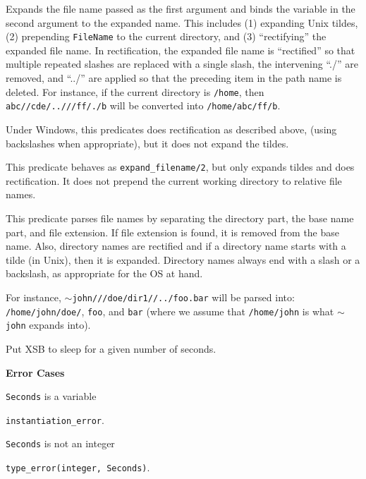 \begin{description}
%
Expands the file name passed as the first argument and binds the
variable in the second argument to the expanded name. This includes
(1) expanding Unix tildes, (2) prepending {\tt FileName} to the
current directory, and (3) ``rectifying'' the expanded file name.  In
rectification, the expanded file name is ``rectified'' so that
multiple repeated slashes are replaced with a single slash, the
intervening ``./'' are removed, and ``../'' are applied so that the
preceding item in the path name is deleted. For instance, if the
current directory is {\tt /home}, then {\tt abc//cde/..///ff/./b} will
be converted into {\tt /home/abc/ff/b}.

Under Windows, this predicates does rectification as described above,
(using backslashes when appropriate), but it does not expand the
tildes.

This predicate behaves as {\tt expand\_filename/2}, but only expands
tildes and does rectification. It does not prepend the current working
directory to relative file names.

This predicate parses file names by separating the directory part, the base
name part, and file extension. If file extension is found, it is removed
from the base name. Also, directory names are rectified and if a directory
name starts with a tilde (in Unix), then it is expanded. Directory names
always end with a slash or a backslash, as appropriate for the OS at hand.

For instance, {\tt $\sim$john///doe/dir1//../foo.bar} will be parsed into:
{\tt /home/john/doe/}, {\tt foo}, and {\tt bar} (where we assume that    
{\tt /home/john} is what {\tt $\sim$john} expands into).  

Put XSB to sleep for a given number of seconds.  

{\bf Error Cases}
\bi
\item 	{\tt Seconds} is a variable
\bi
\item 	{\tt instantiation\_error}.
\ei
\item 	{\tt Seconds} is not an integer
\bi
\item 	{\tt type\_error(integer, Seconds)}.
\ei
\ei


\end{description}
